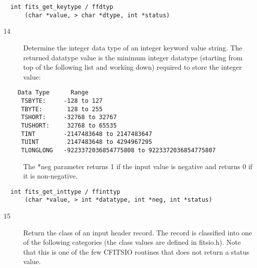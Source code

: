 \documentclass[11pt]{book}
\begin{document}
\begin{verbatim}
  int fits_get_keytype / ffdtyp
      (char *value, > char *dtype, int *status)
\end{verbatim}

\begin{description}
\item[14] Determine the integer data type of an integer keyword value string.
   The returned datatype value is the minimum integer datatype (starting
   from top of the following list and working down) required
  to store the integer value:
\end{description}

\begin{verbatim}
    Data Type      Range
     TSBYTE:     -128 to 127
     TBYTE:       128 to 255
     TSHORT:     -32768 to 32767
     TUSHORT:     32768 to 65535
     TINT        -2147483648 to 2147483647
     TUINT        2147483648 to 4294967295
     TLONGLONG   -9223372036854775808 to 9223372036854775807
\end{verbatim}

\begin{description}
\item[  ]  The *neg parameter returns 1 if the input value is
    negative and returns 0 if it is non-negative.\label{ffinttyp}
\end{description}

\begin{verbatim}
  int fits_get_inttype / ffinttyp
      (char *value, > int *datatype, int *neg, int *status)
\end{verbatim}

\begin{description}
\item[15] Return the class of an input header record.  The record is classified
    into one of the following categories (the class values are
    defined in fitsio.h).  Note that this is one of the few CFITSIO
   routines that does not return a status value. \label{ffgkcl}
\end{description}
\end{document}
